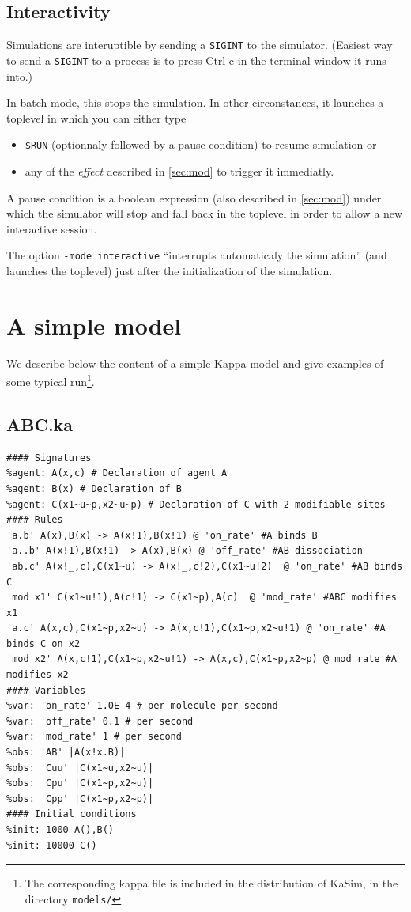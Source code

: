 \documentclass[11pt]{book}
\def\KaSim{\textsf{KaSim}}
\def\ttt#1{\texttt{#1}}
\begin{document}
\section{Interactivity}
Simulations are interuptible by sending a \verb:SIGINT: to the
simulator. (Easiest way to send a \verb:SIGINT: to a process is to
press Ctrl-c in the terminal window it runs into.)

In batch mode, this stops the simulation. In other circonstances, it
launches a toplevel in which you can either type
\begin{itemize}
\item \verb:$RUN: (optionnaly followed by a pause condition) to resume
  simulation or
\item any of the \emph{effect} described in \ref{sec:mod} to trigger
  it immediatly.
\end{itemize}

A pause condition is a boolean expression (also described in
\ref{sec:mod}) under which the simulator will stop and fall back in
the toplevel in order to allow a new interactive session.

The option \ttt{-mode interactive} ``interrupts automaticaly the
simulation'' (and launches the toplevel) just after the initialization
of the simulation.

\chapter{A simple model}\label{chap:abc}

We describe below the content of a simple Kappa model and give examples of some typical run\footnote{The corresponding kappa file is included in the distribution of \KaSim, in the directory \ttt{models/}}.

\section{ABC.ka}
\begin{lstlisting}[language=kappa]
#### Signatures
%agent: A(x,c) # Declaration of agent A
%agent: B(x) # Declaration of B
%agent: C(x1~u~p,x2~u~p) # Declaration of C with 2 modifiable sites
#### Rules
'a.b' A(x),B(x) -> A(x!1),B(x!1) @ 'on_rate' #A binds B
'a..b' A(x!1),B(x!1) -> A(x),B(x) @ 'off_rate' #AB dissociation
'ab.c' A(x!_,c),C(x1~u) -> A(x!_,c!2),C(x1~u!2)  @ 'on_rate' #AB binds C
'mod x1' C(x1~u!1),A(c!1) -> C(x1~p),A(c)  @ 'mod_rate' #ABC modifies x1
'a.c' A(x,c),C(x1~p,x2~u) -> A(x,c!1),C(x1~p,x2~u!1) @ 'on_rate' #A binds C on x2
'mod x2' A(x,c!1),C(x1~p,x2~u!1) -> A(x,c),C(x1~p,x2~p) @ mod_rate #A modifies x2
#### Variables
%var: 'on_rate' 1.0E-4 # per molecule per second
%var: 'off_rate' 0.1 # per second
%var: 'mod_rate' 1 # per second
%obs: 'AB' |A(x!x.B)|
%obs: 'Cuu' |C(x1~u,x2~u)|
%obs: 'Cpu' |C(x1~p,x2~u)|
%obs: 'Cpp' |C(x1~p,x2~p)|
#### Initial conditions
%init: 1000 A(),B()
%init: 10000 C()
\end{lstlisting}
\end{document}
